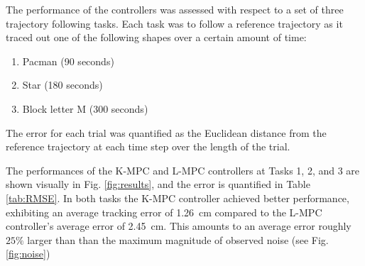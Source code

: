 
The performance of the controllers was assessed with respect to a set of three trajectory following tasks.
Each task was to follow a reference trajectory as it traced out one of the following shapes over a certain amount of time:
\begin{enumerate}
    \item Pacman (90 seconds)
    \item Star (180 seconds)
    \item Block letter M (300 seconds)
\end{enumerate}
The error for each trial was quantified as the Euclidean distance from the reference trajectory at each time step over the length of the trial.

The performances of the K-MPC and L-MPC controllers at Tasks 1, 2, and 3 are shown visually in Fig. \ref{fig:results}, and the error is quantified in Table \ref{tab:RMSE}.
In both tasks the K-MPC controller achieved better performance, exhibiting an average tracking error of 1.26~cm compared to the L-MPC controller's average error of 2.45~cm.
This amounts to an average error roughly $25\%$ larger than than the maximum magnitude of observed noise (see Fig. \ref{fig:noise})



